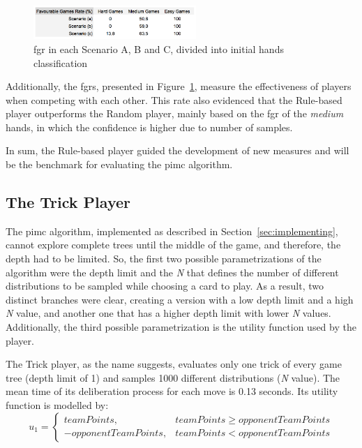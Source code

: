 \begin{figure}[h!]
  \centering
    \includegraphics[width=0.55\textwidth]{./img/4/ABC-fgr}
  \caption{\ac{fgr} in each Scenario A, B and C, divided into initial hands classification}
\label{fig:ABC-fgr}
\end{figure}

Additionally, the \acp{fgr}, presented in Figure~\ref{fig:ABC-fgr}, measure the effectiveness of players when competing with each other.
This rate also evidenced that the Rule-based player outperforms the Random player, mainly based on the \ac{fgr} of the \emph{medium} hands, in which the confidence is higher due to number of samples.

In sum, the Rule-based player guided the development of new measures and will be the benchmark for evaluating the \ac{pimc} algorithm.


\subsection{The Trick Player}

The \ac{pimc} algorithm, implemented as described in Section~\ref{sec:implementing}, cannot explore complete trees until the middle of the game, and therefore, the depth had to be limited.
So, the first two possible parametrizations of the algorithm were the depth limit and the \emph{N} that defines the number of different distributions to be sampled while choosing a card to play.
As a result, two distinct branches were clear, creating a version with a low depth limit and a high \emph{N} value, and another one that has a higher depth limit with lower \emph{N} values.
Additionally, the third possible parametrization is the utility function used by the player.

The Trick player, as the name suggests, evaluates only one trick of every game tree (depth limit of 1) and samples 1000 different distributions (\emph{N} value).
The mean time of its deliberation process for each move is 0.13 seconds.
Its utility function is modelled by:
\begin{equation} \label{eq:uf1}
u_1 = \left\{
                \begin{array}{ll}
                  teamPoints, & teamPoints \geq opponentTeamPoints\\
                  - opponentTeamPoints, & teamPoints < opponentTeamPoints
                \end{array}
              \right.
\end{equation}

